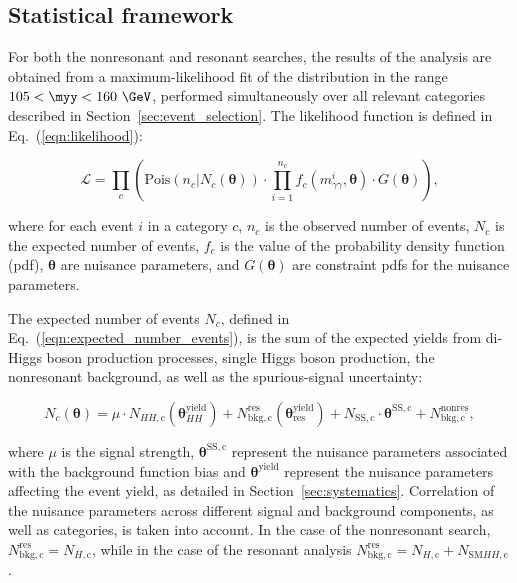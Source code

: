 \documentclass[PAPER, cernpreprint, texlive=2016, paper=a4, USenglish, texmf]{atlasdoc}
\begin{document}
\subsection{Statistical framework}
For both the nonresonant and resonant searches, the results of the analysis are obtained from a maximum-likelihood fit of the \myy distribution in the range $105 < \myy < 160~\GeV$, performed simultaneously over all relevant categories described in Section~\ref{sec:event_selection}. The likelihood function is defined in Eq.~(\ref{eqn:likelihood}):
 
\begin{equation}
\label{eqn:likelihood}
\mathcal{L} = {\displaystyle\prod_{c}\left(\mathrm{Pois}(n_c|N_c(\pmb{\theta}))\cdot{\displaystyle\prod_{i=1}^{n_c} f_c(m_{\gamma\gamma}^i,\pmb{\theta})} \cdot G( \pmb{\theta})\right)},
\end{equation}
 
where for each event $i$ in a category $c$, $n_c$ is the observed number of events, $N_c$ is the expected number of events, $f_c$ is the value of the probability density function (pdf), $\pmb{\theta}$ are nuisance parameters, and $G(\pmb{\theta})$ are constraint pdfs for the nuisance parameters.
 
The expected number of events $N_c$, defined in Eq.~(\ref{eqn:expected_number_events}), is the sum of the expected yields from di-Higgs boson production processes, single Higgs boson production, the nonresonant background, as well as the spurious-signal uncertainty:
 
\begin{equation}
\label{eqn:expected_number_events}
N_c( \pmb{\theta}) = \mu \cdot N_{HH,\mathrm{c}}( \pmb{\theta}_{HH}^\mathrm{yield}) + N^{\mathrm{res}}_{\mathrm{bkg,c}}( \pmb{\theta}_{\mathrm{res}}^\mathrm{yield}) + N_{\mathrm{SS,c}} \cdot  \pmb{\theta}^{\mathrm{SS, c}} + N^{\mathrm{nonres}}_{\mathrm{bkg,c}},
\end{equation}
 
where $\mu$ is the signal strength, $ \pmb{\theta}^\mathrm{SS, c}$ represent the nuisance parameters associated with the background function bias and $ \pmb{\theta}^\mathrm{yield}$ represent the nuisance parameters affecting the event yield, as detailed in Section~\ref{sec:systematics}. Correlation of the nuisance parameters across different signal and background components, as well as categories, is taken into account. In the case of the nonresonant search, $N^{\mathrm{res}}_{\mathrm{bkg,c}} =  N_{H,\mathrm{c}}$, while in the case of the resonant analysis $N^{\mathrm{res}}_{\mathrm{bkg,c}} =  N_{H,\mathrm{c}} +  N_{\mathrm{SM} HH,\mathrm{c}}$.
 
\end{document}
